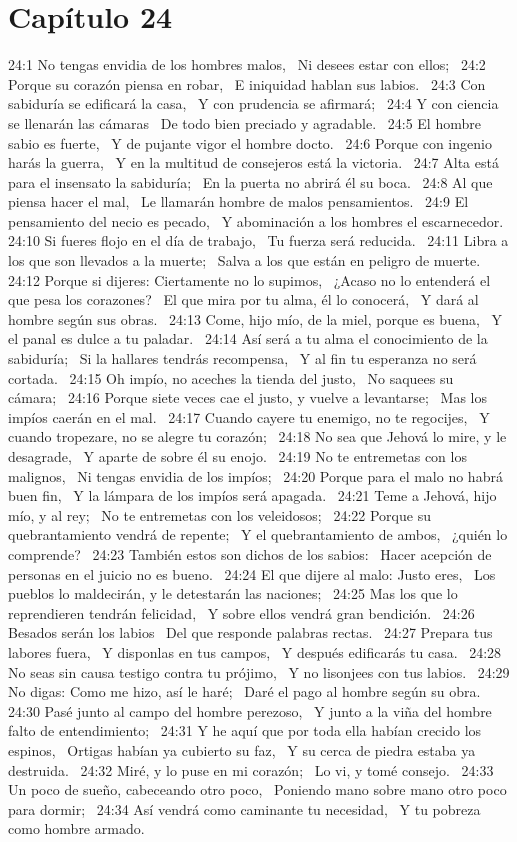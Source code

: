 \section*{Capítulo 24 }

24:1 No tengas envidia de los hombres malos,  
Ni desees estar con ellos;  
24:2 Porque su corazón piensa en robar,  
E iniquidad hablan sus labios.  
24:3 Con sabiduría se edificará la casa,  
Y con prudencia se afirmará;  
24:4 Y con ciencia se llenarán las cámaras  
De todo bien preciado y agradable.  
24:5 El hombre sabio es fuerte,  
Y de pujante vigor el hombre docto.  
24:6 Porque con ingenio harás la guerra,  
Y en la multitud de consejeros está la victoria.  
24:7 Alta está para el insensato la sabiduría;  
En la puerta no abrirá él su boca.  
24:8 Al que piensa hacer el mal,  
Le llamarán hombre de malos pensamientos.  
24:9 El pensamiento del necio es pecado,  
Y abominación a los hombres el escarnecedor.  
24:10 Si fueres flojo en el día de trabajo,  
Tu fuerza será reducida.  
24:11 Libra a los que son llevados a la muerte;  
Salva a los que están en peligro de muerte.  
24:12 Porque si dijeres: Ciertamente no lo supimos,  
¿Acaso no lo entenderá el que pesa los corazones?  
El que mira por tu alma, él lo conocerá,  
Y dará al hombre según sus obras.  
24:13 Come, hijo mío, de la miel, porque es buena,  
Y el panal es dulce a tu paladar.  
24:14 Así será a tu alma el conocimiento de la sabiduría;  
Si la hallares tendrás recompensa,  
Y al fin tu esperanza no será cortada.  
24:15 Oh impío, no aceches la tienda del justo,  
No saquees su cámara;  
24:16 Porque siete veces cae el justo, y vuelve a levantarse;  
Mas los impíos caerán en el mal.  
24:17 Cuando cayere tu enemigo, no te regocijes,  
Y cuando tropezare, no se alegre tu corazón;  
24:18 No sea que Jehová lo mire, y le desagrade,  
Y aparte de sobre él su enojo.  
24:19 No te entremetas con los malignos,  
Ni tengas envidia de los impíos;  
24:20 Porque para el malo no habrá buen fin,  
Y la lámpara de los impíos será apagada.  
24:21 Teme a Jehová, hijo mío, y al rey;  
No te entremetas con los veleidosos;  
24:22 Porque su quebrantamiento vendrá de repente;  
Y el quebrantamiento de ambos,  
¿quién lo comprende?  
24:23 También estos son dichos de los sabios:  
Hacer acepción de personas en el juicio no es bueno.  
24:24 El que dijere al malo: Justo eres,  
Los pueblos lo maldecirán, y le detestarán las naciones;  
24:25 Mas los que lo reprendieren tendrán felicidad,  
Y sobre ellos vendrá gran bendición.  
24:26 Besados serán los labios  
Del que responde palabras rectas.  
24:27 Prepara tus labores fuera,  
Y disponlas en tus campos,  
Y después edificarás tu casa.  
24:28 No seas sin causa testigo contra tu prójimo,  
Y no lisonjees con tus labios.  
24:29 No digas: Como me hizo, así le haré;  
Daré el pago al hombre según su obra.  
24:30 Pasé junto al campo del hombre perezoso,  
Y junto a la viña del hombre falto de entendimiento;  
24:31 Y he aquí que por toda ella habían crecido los espinos,  
Ortigas habían ya cubierto su faz,  
Y su cerca de piedra estaba ya destruida.  
24:32 Miré, y lo puse en mi corazón;  
Lo vi, y tomé consejo.  
24:33 Un poco de sueño, cabeceando otro poco,  
Poniendo mano sobre mano otro poco para dormir;  
24:34 Así vendrá como caminante tu necesidad,  
Y tu pobreza como hombre armado. 
